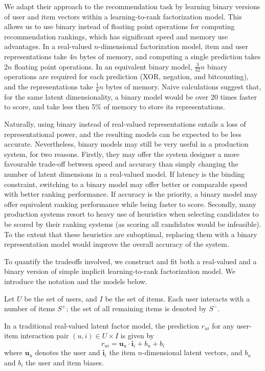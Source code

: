 \documentclass[sigchi]{acmart}
\newcommand\symUserSet{U}
\newcommand\symItemSet{I}
\newcommand\symUserInteractionSet{S}
\renewcommand\vec{\mathbf}
\begin{document}
We adapt their approach to the recommendation task by learning binary versions of user and item vectors within a learning-to-rank factorization model. This allows us to use binary instead of floating point operations for computing recommendation rankings, which has significant speed and memory use advantages. In a real-valued $n$-dimensional factorization model, item and user representations take $4n$ bytes of memory, and computing a single prediction takes $2n$ floating point operations. In an equivalent binary model, $\frac{3}{32}n$ binary operations are required for each prediction (XOR, negation, and bitcounting), and the representations take $\frac{1}{8}n$ bytes of memory. Naive calculations suggest that, for the same latent dimensionality, a binary model would be over 20 times faster to score, and take less then 5\% of memory to store its representations.

Naturally, using binary instead of real-valued representations entails a loss of representational power, and the resulting models can be expected to be less accurate. Nevertheless, binary models may still be very useful in a production system, for two reasons. Firstly, they may offer the system designer a more favourable trade-off between speed and accuracy than simply changing the number of latent dimensions in a real-valued model. If latency is the binding constraint, switching to a binary model may offer better or comparable speed with better ranking performance. If accuracy is the priority, a binary model may offer equivalent ranking performance while being faster to score. Secondly, many production systems resort to heavy use of heuristics when selecting candidates to be scored by their ranking systems (as scoring all candidates would be infeasible). To the extent that these heuristics are suboptimal, replacing them with a binary representation model would improve the overall accuracy of the system.

To quantify the tradeoffs involved, we construct and fit both a real-valued and a binary version of simple implicit learning-to-rank factorization model. We introduce the notation and the models below.

Let $\symUserSet$ be the set of users, and $\symItemSet$ be the set of items. Each user interacts with a number of items $\symUserInteractionSet^+$; the set of all remaining items is denoted by $\symUserInteractionSet^-$.

In a traditional real-valued latent factor model, the prediction $r_{ui}$ for any user-item interaction pair $(u, i) \in \symUserSet \times \symItemSet$ is given by
\begin{equation}
r_{ui} = \vec{u}_u \cdot \vec{i}_i + b_u + b_i
\end{equation}
where $\vec{u}_u$ denotes the user and $\vec{i}_i$ the item $n$-dimensional latent vectors, and $b_u$ and $b_i$ the user and item biases.
\end{document}
